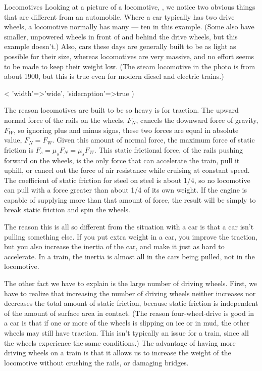 \begin{eg}{Locomotives}\label{eg:locomotives}
Looking at a picture of a locomotive, , we notice
two obvious things that are different from an automobile. Where a car
typically has two drive wheels, a locomotive normally has many --- ten
in this example. (Some also have smaller, unpowered wheels in front of and
behind the drive wheels, but this example doesn't.) Also, cars these days are generally built to be as light as possible
for their size, whereas locomotives are very massive, and no effort seems to be made
to keep their weight low. (The steam locomotive in the photo is from about 1900, but this
is true even for modern diesel and electric trains.)

<%
    {
      'width'=>'wide',
      'sidecaption'=>true
    }
) %

The reason locomotives are built to be so heavy is for traction. The upward normal force of
the rails on the wheels, $F_N$, cancels the downward force of gravity, $F_W$, so ignoring plus and minus
signs, these two forces are equal in absolute value, $F_N=F_W$. Given this amount of normal
force, the maximum force of static friction is $F_s=\mu_s F_N=\mu_s F_W$. This static frictional
force, of the rails pushing forward on the wheels, is the only force that can accelerate the
train, pull it uphill, or cancel out the force of air resistance while cruising at constant speed.
The coefficient of static friction for steel on steel is about 1/4, so no locomotive can pull
with a force greater than about 1/4 of its own weight. If the engine is capable of supplying
more than that amount of force, the result will be simply to break static friction and spin the wheels.

The reason this is all so different from the situation with a car is that a car isn't pulling
something else. If you put extra weight in a car, you improve the traction, but you also
increase the inertia of the car, and make it just as hard to accelerate. In a train, the inertia
is almost all in the cars being pulled, not in the locomotive.

The other fact we have to explain is the large number of driving wheels. First, we have to
realize that increasing the number of driving wheels neither increases nor decreases the
total amount of static friction, because static friction is independent of the amount of
surface area in contact. (The reason four-wheel-drive is good in a car is that if one or
more of the wheels is slipping on ice or in mud, the other wheels may still have traction.
This isn't typically an issue for a train, since all the wheels experience the same conditions.)
The advantage of having more driving wheels on a train is that it allows us to increase the weight of the locomotive
without crushing the rails, or damaging bridges.
\end{eg}

